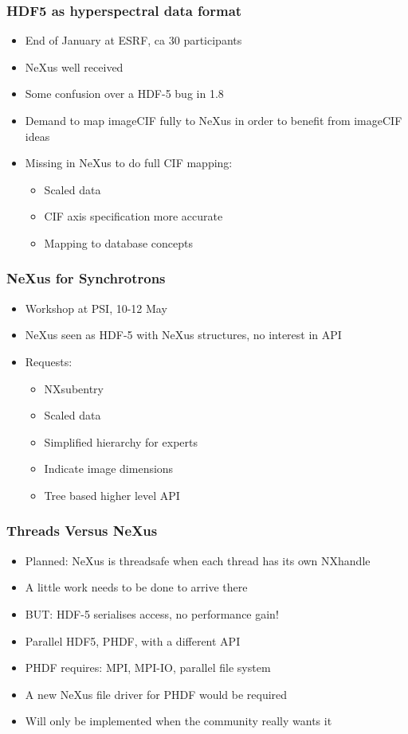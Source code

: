 \documentclass{beamer}
\begin{document}
\begin{frame} \frametitle{HDF5 as hyperspectral data format}
\begin{itemize}
\item End of January at ESRF, ca 30 participants
\item NeXus well received
\item Some confusion over a HDF-5 bug in 1.8
\item Demand to map imageCIF fully to NeXus in order to benefit from imageCIF ideas
\item Missing in NeXus to do full CIF mapping:
\begin{itemize}
\item Scaled data
\item CIF axis specification more accurate
\item Mapping to database concepts
\end{itemize}
\end{itemize}
\end{frame}


\begin{frame} \frametitle{NeXus for Synchrotrons}
\begin{itemize}
\item Workshop at PSI, 10-12 May
\item NeXus seen as HDF-5 with NeXus structures, no interest in API
\item Requests:
\begin{itemize}
\item NXsubentry
\item Scaled data
\item Simplified hierarchy for experts
\item Indicate image dimensions
\item Tree based higher level API
\end{itemize}
\end{itemize}
\end{frame}

\begin{frame} \frametitle{Threads Versus NeXus}
\begin{itemize}
\item Planned: NeXus is threadsafe when each thread has its own NXhandle
\item A little work needs to be done to arrive there
\item {\color{red}BUT:} HDF-5 serialises access, no performance gain!
\item Parallel HDF5, PHDF, with a different API
\item PHDF requires: MPI, MPI-IO, parallel file system
\item A new NeXus file driver for PHDF would be required
\item Will only be implemented when the community really wants it
\end{itemize}
\end{frame}
\end{document}
